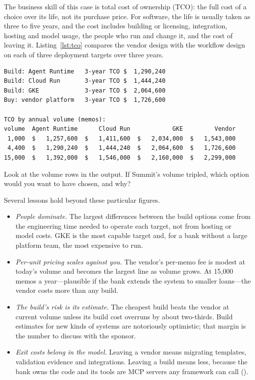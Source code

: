 The business skill of this case is total cost of ownership (TCO): the full cost of a choice over its life, not its purchase price. For software, the life is usually taken as three to five years, and the cost includes building or licensing, integration, hosting and model usage, the people who run and change it, and the cost of leaving it. Listing~\ref{lst:tco} compares the vendor design with the workflow design on each of three deployment targets over three years.



\begin{lstlisting}[language={}, numbers=none, frame=none, xleftmargin=1.5em]
Build: Agent Runtime   3-year TCO $  1,290,240
Build: Cloud Run       3-year TCO $  1,444,240
Build: GKE             3-year TCO $  2,064,600
Buy: vendor platform   3-year TCO $  1,726,600

TCO by annual volume (memos):
volume  Agent Runtime      Cloud Run            GKE         Vendor
 1,000  $   1,257,600  $   1,411,600  $   2,034,000  $   1,543,000
 4,400  $   1,290,240  $   1,444,240  $   2,064,600  $   1,726,600
15,000  $   1,392,000  $   1,546,000  $   2,160,000  $   2,299,000
\end{lstlisting}

\begin{thinkabout}
Look at the volume rows in the output. If Summit's volume tripled, which option would you want to have chosen, and why?
\end{thinkabout}

Several lessons hold beyond these particular figures.
\begin{itemize}[itemsep=2pt]
  \item \emph{People dominate.} The largest differences between the build options come from the engineering time needed to operate each target, not from hosting or model costs. GKE is the most capable target and, for a bank without a large platform team, the most expensive to run.
  \item \emph{Per-unit pricing scales against you.} The vendor's per-memo fee is modest at today's volume and becomes the largest line as volume grows. At 15{,}000 memos a year---plausible if the bank extends the system to smaller loans---the vendor costs more than any build.
  \item \emph{The build's risk is its estimate.} The cheapest build beats the vendor at current volume unless its build cost overruns by about two-thirds. Build estimates for new kinds of systems are notoriously optimistic; that margin is the number to discuss with the sponsor.
  \item \emph{Exit costs belong in the model.} Leaving a vendor means migrating templates, validation evidence and integrations. Leaving a build means less, because the bank owns the code and its tools are MCP servers any framework can call ().
\end{itemize}

